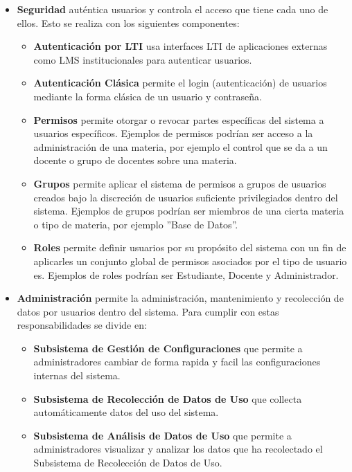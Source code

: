 \begin{itemize}
	\item \textbf{Seguridad} auténtica usuarios y controla el acceso que tiene cada uno de ellos. Esto se realiza con los siguientes componentes:
    \begin{itemize}
    	\item \textbf{Autenticación por LTI} usa interfaces LTI  de aplicaciones externas como LMS  institucionales para autenticar usuarios. 
		\item \textbf{Autenticación Clásica} permite el login (autenticación) de usuarios mediante la forma clásica de un usuario y contraseña.
		\item \textbf{Permisos} permite otorgar o revocar partes específicas del sistema a usuarios específicos. Ejemplos de permisos podrían ser acceso a la administración de una materia, por ejemplo el control que se da a un docente o grupo de docentes sobre una materia.
		\item \textbf{Grupos} permite aplicar el sistema de permisos a grupos de usuarios creados bajo la discreción de usuarios suficiente privilegiados dentro del sistema. Ejemplos de grupos podrían ser miembros de una cierta materia o tipo de materia, por ejemplo ''Base de Datos''.
		\item \textbf{Roles} permite definir usuarios por su propósito del sistema con un fin de aplicarles un conjunto global de permisos asociados por el tipo de usuario es. Ejemplos de roles podrían ser Estudiante, Docente y Administrador.
    \end{itemize}
    \item \textbf{Administración} permite la administración, mantenimiento y recolección de datos por usuarios dentro del sistema. Para cumplir con estas responsabilidades se divide en:
    \begin{itemize}
    	\item \textbf{Subsistema de Gestión de Configuraciones} que permite a administradores cambiar de forma rapida y facil las configuraciones internas del sistema.
        \item \textbf{Subsistema de Recolección de Datos de Uso} que collecta automáticamente datos del uso del sistema. 
        \item \textbf{Subsistema de Análisis de Datos de Uso} que permite a administradores visualizar y analizar los datos que ha recolectado el Subsistema de Recolección de Datos de Uso. 

\end{itemize}
\end{itemize}
